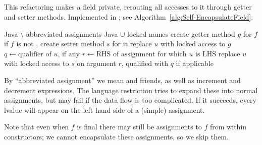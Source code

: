 \subsection{}
This refactoring makes a field private, rerouting all accesses to it through getter and setter methods. Implemented in ; see Algorithm~\ref{alg:Self-EncapsulateField}.

\begin{algorithm}[p]
\caption{$\refactoring{Self-Encapsulate Field}(f : \type{Field})$}\label{alg:Self-EncapsulateField}
\begin{algorithmic}[1]
\REQUIRE Java $\setminus$ abbreviated assignments
\ENSURE Java $\cup$ locked names
\medskip
\STATE create getter method $g$ for $f$
\STATE if $f$ is not , create setter method $s$ for it
      \STATE replace $u$ with locked access to $g$
    \ELSE
        \STATE $q \leftarrow \text{qualifier of $u$, if any}$
        \STATE $r \leftarrow \text{RHS of assignment for which $u$ is LHS}$
        \STATE replace $u$ with locked access to $s$ on argument $r$, qualified with $q$ if applicable
      \ENDIF
    \ENDIF
  \ENDIF
\ENDFOR
\end{algorithmic}
\end{algorithm}

By ``abbreviated assignment'' we mean  and friends, as well as increment and decrement expressions. The language restriction tries to expand these into normal assignments, but may fail if the data flow is too complicated. If it succeeds, every lvalue will appear on the left hand side of a (simple) assignment.

Note that even when $f$ is final there may still be assignments to $f$ from within constructors; we cannot encapsulate these assignments, so we skip them.
